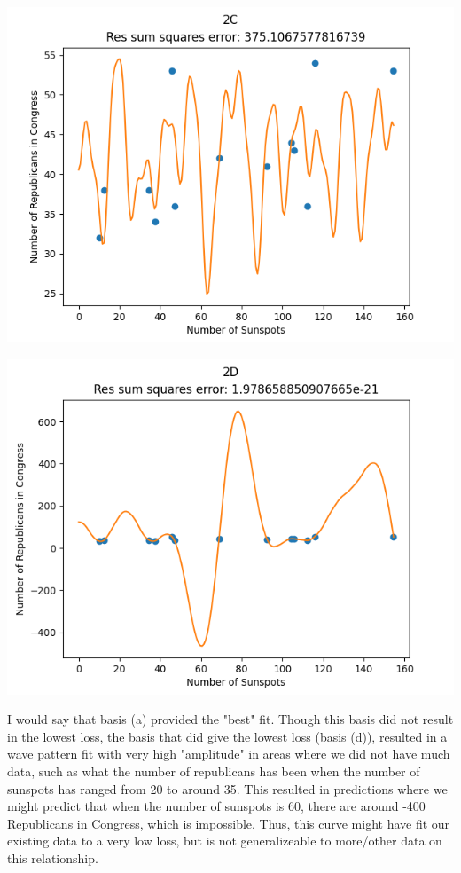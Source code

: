 \documentclass[submit]{harvardml}
\begin{document}
\begin{enumerate}
    \includegraphics[scale=0.6]{plot-4-2c.png}

    \includegraphics[scale=0.6]{plot-4-2d.png}

    I would say that basis (a) provided the "best" fit. Though this basis did not result in the lowest loss, the basis that did give the lowest loss (basis (d)), resulted in a wave pattern fit with very high "amplitude" in areas where we did not have much data, such as what the number of republicans has been when the number of sunspots has ranged from 20 to  around 35. This resulted in predictions where we might predict that when the number of sunspots is 60, there are around -400 Republicans in Congress, which is impossible. Thus, this curve might have fit our existing data to a very low loss, but is not generalizeable to more/other data on this relationship.


\end{enumerate}
\end{document}
